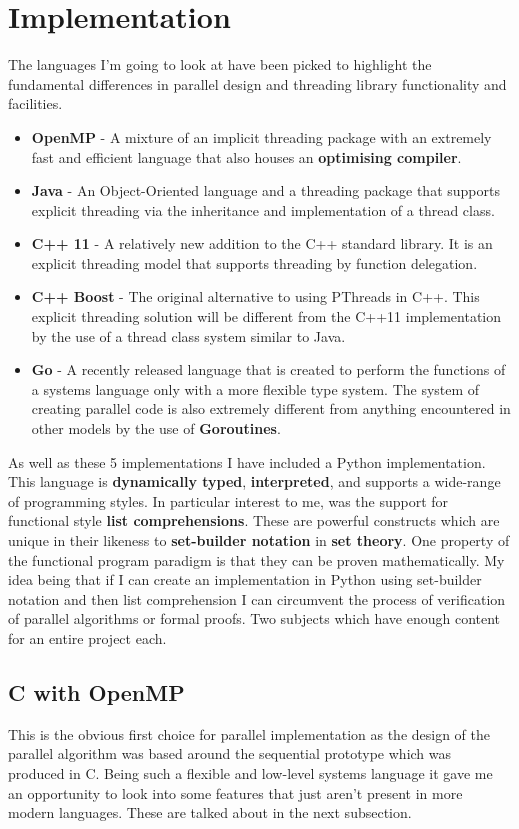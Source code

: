 \documentclass[11pt]{article} %
\begin{document}
\section{Implementation}
The languages I'm going to look at have been picked to highlight the fundamental differences in parallel design and threading library functionality and facilities. 
\begin{itemize}
\item {\bf OpenMP} - A mixture of an implicit threading package with an extremely fast and efficient language that also houses an {\bf optimising compiler}.
\item {\bf Java} - An Object-Oriented language and a threading package that supports explicit threading via the inheritance and implementation of a thread class.
\item {\bf C++ 11} - A relatively new addition to the C++ standard library. It is an explicit threading model that supports threading by function delegation.
\item {\bf C++ Boost} - The original alternative to using PThreads in C++. This explicit threading solution will be different from the C++11 implementation by the use of a thread class system similar to Java.
\item {\bf Go} - A recently released language that is created to perform the functions of a systems language only with a more flexible type system. The system of creating parallel code is also extremely different from anything encountered in other models by the use of {\bf Goroutines}.
\end{itemize}
\bigskip
As well as these 5 implementations I have included a Python implementation. This language is {\bf dynamically typed}, {\bf interpreted}, and supports a wide-range of programming styles. In particular interest to me, was the support for functional style {\bf list comprehensions}. These are powerful constructs which are unique in their likeness to {\bf set-builder notation} in {\bf set theory}. One property of the functional program paradigm is that they can be proven mathematically. My idea being that if I can create an implementation in Python using set-builder notation and then list comprehension I can circumvent the process of verification of parallel algorithms or formal proofs. Two subjects which have enough content for an entire project each.

\subsection{C with OpenMP}
This is the obvious first choice for parallel implementation as the design of the parallel algorithm was based around the sequential prototype which was produced in C. Being such a flexible and low-level systems language it gave me an opportunity to look into some features that just aren't present in more modern languages. These are talked about in the next subsection.
\end{document}
